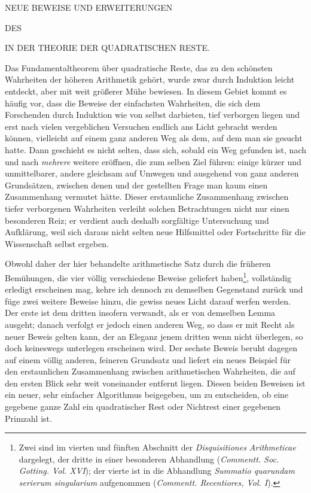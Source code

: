 \begin{center}
{\large NEUE BEWEISE UND ERWEITERUNGEN\par}
\smallskip DES\par
{}
\medskip IN DER THEORIE DER QUADRATISCHEN RESTE.\par
\end{center}
\BookRule{20mm}
Das Fundamentaltheorem über quadratische Reste, das zu den schönsten Wahrheiten der höheren Arithmetik gehört, wurde zwar durch Induktion leicht entdeckt, aber mit weit größerer Mühe bewiesen. In diesem Gebiet kommt es häufig vor, dass die Beweise der einfachsten Wahrheiten, die sich dem Forschenden durch Induktion wie von selbst darbieten, tief verborgen liegen und erst nach vielen vergeblichen Versuchen endlich ans Licht gebracht werden können, vielleicht auf einem ganz anderen Weg als dem, auf dem man sie gesucht hatte. Dann geschieht es nicht selten, dass sich, sobald ein Weg gefunden ist, nach und nach \textit{mehrere} weitere eröffnen, die zum selben Ziel führen: einige kürzer und unmittelbarer, andere gleichsam auf Umwegen und ausgehend von ganz anderen Grundsätzen, zwischen denen und der gestellten Frage man kaum einen Zusammenhang vermutet hätte. Dieser erstaunliche Zusammenhang zwischen tiefer verborgenen Wahrheiten verleiht solchen Betrachtungen nicht nur einen besonderen Reiz; er verdient auch deshalb sorgfältige Untersuchung und Aufklärung, weil sich daraus nicht selten neue Hilfsmittel oder Fortschritte für die Wissenschaft selbst ergeben.

Obwohl daher der hier behandelte arithmetische Satz durch die früheren Bemühungen, die vier völlig verschiedene Beweise geliefert haben\begingroup\renewcommand{\thefootnote}{*)}\footnote{Zwei sind im vierten und fünften Abschnitt der \textit{Disquisitiones Arithmeticae} dargelegt, der dritte in einer besonderen Abhandlung (\textit{Commentt. Soc. Gotting. Vol. XVI}); der vierte ist in die Abhandlung \textit{Summatio quarundam serierum singularium} aufgenommen (\textit{Commentt. Recentiores, Vol. I}).}\endgroup, vollständig erledigt erscheinen mag, kehre ich dennoch zu demselben Gegenstand zurück und füge zwei weitere Beweise hinzu, die gewiss neues Licht darauf werfen werden. Der erste ist dem dritten insofern verwandt, als er von demselben Lemma ausgeht; danach verfolgt er jedoch einen anderen Weg, so dass er mit Recht als neuer Beweis gelten kann, der an Eleganz jenem dritten wenn nicht überlegen, so doch keineswegs unterlegen erscheinen wird. Der sechste Beweis beruht dagegen auf einem völlig anderen, feineren Grundsatz und liefert ein neues Beispiel für den erstaunlichen Zusammenhang zwischen arithmetischen Wahrheiten, die auf den ersten Blick sehr weit voneinander entfernt liegen. Diesen beiden Beweisen ist ein neuer, sehr einfacher Algorithmus beigegeben, um zu entscheiden, ob eine gegebene ganze Zahl ein quadratischer Rest oder Nichtrest einer gegebenen Primzahl ist.

